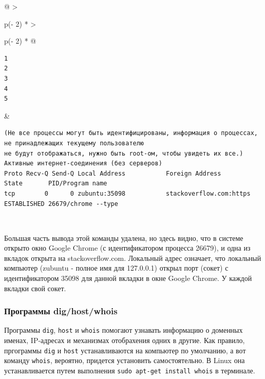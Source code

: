 \documentclass{report}
\begin{document}
\begin{longtable}[]{@{}
  >{\raggedright\arraybackslash}p{(\columnwidth - 2\tabcolsep) * }
  >{\raggedright\arraybackslash}p{(\columnwidth - 2\tabcolsep) * }@{}}
\toprule
\endhead
\begin{minipage}[t]{\linewidth}\raggedright
\begin{verbatim}
1
2
3
4
5
\end{verbatim}
\end{minipage} & \begin{minipage}[t]{\linewidth}\raggedright
\begin{verbatim}
(Не все процессы могут быть идентифицированы, информация о процессах, не принадлежащих текущему пользователю
не будут отображаться, нужно быть root-ом, чтобы увидеть их все.)
Активные интернет-соединения (без серверов)
Proto Recv-Q Send-Q Local Address           Foreign Address         State       PID/Program name
tcp        0      0 zubuntu:35098           stackoverflow.com:https ESTABLISHED 26679/chrome --type
\end{verbatim}
\end{minipage} \\ \addlinespace
\bottomrule
\end{longtable}

Большая часть вывода этой команды удалена, но здесь видно, что в системе
открыто окно Google Chrome (с идентификатором процесса 26679), и одна из
вкладок открыта на stackoverflow.com. Локальный адрес означает, что
локальный компьютер (zubuntu - полное имя для 127.0.0.1) открыл порт
(сокет) с идентификатором 35098 для данной вкладки в окне Google Chrome.
У каждой вкладки свой сокет.

\hypertarget{dig-host-whois}{%
\subsubsection{\texorpdfstring{\protect\hyperlink{dig-host-whois}{}Программы
dig/host/whois}{Программы dig/host/whois}}\label{dig-host-whois}}

Программы \texttt{dig}, \texttt{host} и \texttt{whois} помогают узнавать
информацию о доменных именах, IP-адресах и механизмах отобрахения одних
в другие. Как правило, пргограммы \texttt{dig} и \texttt{host}
устанавливаются на компьютер по умолчанию, а вот команду \texttt{whois},
вероятно, придется установить самостоятельно. В Linux она
устанавливается путем выполнения \texttt{sudo\ apt-get\ install\ whois}
в терминале.
\end{document}

